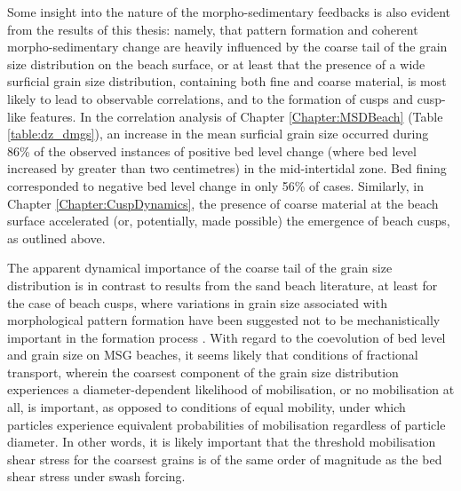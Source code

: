 Some insight into the nature of the morpho-sedimentary feedbacks is also evident from the results of this thesis: namely, that pattern formation and coherent morpho-sedimentary change are heavily influenced by the coarse tail of the grain size distribution on the beach surface, or at least that the presence of a wide surficial grain size distribution, containing both fine and coarse material, is most likely to lead to observable correlations, and to the formation of cusps and cusp-like features. In the correlation analysis of Chapter \ref{Chapter:MSDBeach} (Table \ref{table:dz_dmgs}), an increase in the mean surficial grain size occurred during 86\% of the observed instances of positive bed level change (where bed level increased by greater than two centimetres) in the mid-intertidal zone. Bed fining corresponded to negative bed level change in only 56\% of cases. Similarly, in  Chapter \ref{Chapter:CuspDynamics}, the presence of coarse material at the beach surface accelerated (or, potentially, made possible) the emergence of beach cusps, as outlined above. %

The apparent dynamical importance of the coarse tail of the grain size distribution is in contrast to results from the sand beach literature, at least for the case of beach cusps, where variations in grain size associated with morphological pattern formation have been suggested not to be mechanistically important in the formation process \citep{VanGaalen_etal2011}. With regard to the coevolution of bed level and grain size on MSG beaches, it seems likely that conditions of fractional transport, wherein the coarsest component of the grain size distribution experiences a diameter-dependent likelihood of mobilisation, or no mobilisation at all, is important, as opposed to conditions of equal mobility, under which particles experience equivalent probabilities of mobilisation regardless of particle diameter. In other words, it is likely important that the threshold mobilisation shear stress for the coarsest grains is of the same order of magnitude as the bed shear stress under swash forcing.  %


